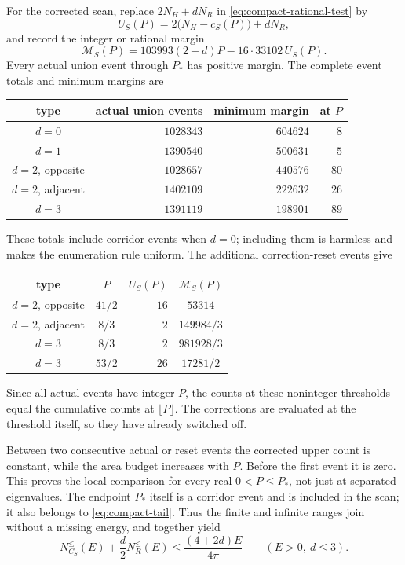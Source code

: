 \documentclass[11pt,reqno]{amsart}
\numberwithin{equation}{section}
\begin{document}
For the corrected scan, replace $2N_H+dN_R$ in
\eqref{eq:compact-rational-test} by
\[
 U_S(P)=2\bigl(N_H-c_S(P)\bigr)+dN_R,
\]
and record the integer or rational margin
\begin{equation}
 \mathcal M_S(P)=103993(2+d)P-16\cdot33102\,U_S(P).
 \label{eq:compact-margin}
\end{equation}
Every actual union event through $P_*$ has positive margin. The complete
event totals and minimum margins are
\begin{center}
\begin{tabular}{c|r|r|r}
type & actual union events & minimum margin & at $P$\\ \hline
$d=0$ & $1028343$ & $604624$ & $8$\\
$d=1$ & $1390540$ & $500631$ & $5$\\
$d=2$, opposite & $1028657$ & $440576$ & $80$\\
$d=2$, adjacent & $1402109$ & $222632$ & $26$\\
$d=3$ & $1391119$ & $198901$ & $89$
\end{tabular}
\end{center}
These totals include corridor events when $d=0$; including them is
harmless and makes the enumeration rule uniform. The additional
correction-reset events give
\begin{center}
\begin{tabular}{c|c|r|c}
type & $P$ & $U_S(P)$ & $\mathcal M_S(P)$\\ \hline
$d=2$, opposite & $41/2$ & $16$ & $53314$\\
$d=2$, adjacent & $8/3$ & $2$ & $149984/3$\\
$d=3$ & $8/3$ & $2$ & $981928/3$\\
$d=3$ & $53/2$ & $26$ & $17281/2$
\end{tabular}
\end{center}
Since all actual events have integer $P$, the counts at these
noninteger thresholds equal the cumulative counts at $\lfloor P\rfloor$.
The corrections are evaluated at the threshold itself, so they have
already switched off.

Between two consecutive actual or reset events the corrected upper
count is constant, while the area budget increases with $P$. Before
the first event it is zero. This proves the local comparison for every
real $0<P\le P_*$, not just at separated eigenvalues. The endpoint
$P_*$ itself is a corridor event and is included in the scan; it also
belongs to \eqref{eq:compact-tail}. Thus the finite and infinite ranges
join without a missing energy, and together yield
\begin{equation}
 N_{C_S}^{\le}(E)+\frac d2N_R^{\le}(E)
 \le\frac{(4+2d)E}{4\pi}
 \qquad(E>0,\ d\le3).
 \label{eq:compact-final-module}
\end{equation}
\end{document}
